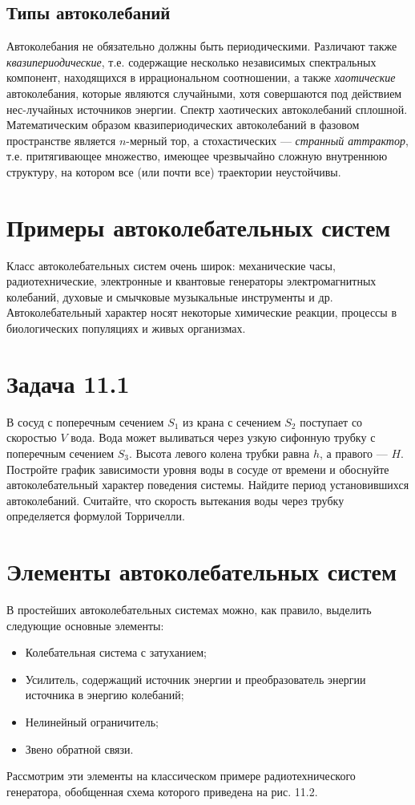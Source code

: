 \documentclass[a4paper,12pt]{article}
\begin{document}
\subsection{Типы автоколебаний}

Автоколебания не обязательно должны быть периодическими. Различают также \textit{квазипериодические}, т.е. содержащие несколько независимых спектральных компонент, находящихся в иррациональном соотношении, а также \textit{хаотические} автоколебания, которые являются случайными, хотя совершаются под действием нес-лучайных источников энергии. Спектр хаотических автоколебаний сплошной. Математическим образом квазипериодических автоколебаний в фазовом пространстве является \( n \)-мерный тор, а стохастических — \textit{странный аттрактор}, т.е. притягивающее множество, имеющее чрезвычайно сложную внутреннюю структуру, на котором все (или почти все) траектории неустойчивы.

\section{Примеры автоколебательных систем}

Класс автоколебательных систем очень широк: механические часы, радиотехнические, электронные и квантовые генераторы электромагнитных колебаний, духовые и смычковые музыкальные инструменты и др. Автоколебательный характер носят некоторые химические реакции, процессы в биологических популяциях и живых организмах.

\section{Задача 11.1}

В сосуд с поперечным сечением \( S_1 \) из крана с сечением \( S_2 \) поступает со скоростью \( V \) вода. Вода может выливаться через узкую сифонную трубку с поперечным сечением \( S_3 \). Высота левого колена трубки равна \( h \), а правого — \( H \). Постройте график зависимости уровня воды в сосуде от времени и обоснуйте автоколебательный характер поведения системы. Найдите период установившихся автоколебаний. Считайте, что скорость вытекания воды через трубку определяется формулой Торричелли.

\section{Элементы автоколебательных систем}

В простейших автоколебательных системах можно, как правило, выделить следующие основные элементы:
\begin{itemize}
    \item Колебательная система с затуханием;
    \item Усилитель, содержащий источник энергии и преобразователь энергии источника в энергию колебаний;
    \item Нелинейный ограничитель;
    \item Звено обратной связи.
\end{itemize}

Рассмотрим эти элементы на классическом примере радиотехнического генератора, обобщенная схема которого приведена на рис. 11.2.
\end{document}
